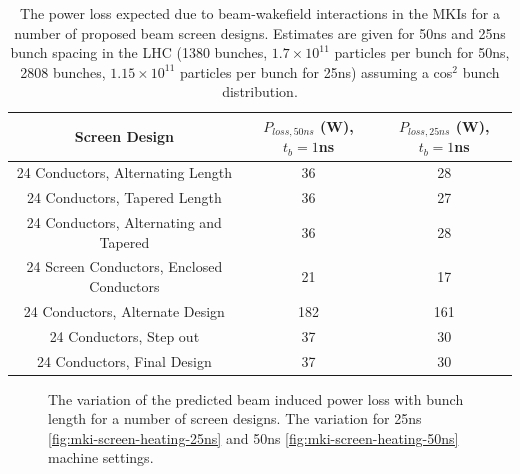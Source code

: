 \begin{table}
\caption{The power loss expected due to beam-wakefield interactions in the MKIs for a number of proposed beam screen designs. Estimates are given for 50ns and 25ns bunch spacing in the LHC (1380 bunches, $1.7 \times 10^{11}$ particles per bunch for 50ns, 2808 bunches, $1.15 \times 10^{11}$ particles per bunch for 25ns) assuming a cos$^{2}$ bunch distribution.}
\label{tab:heating-mki-screen-designs}
\begin{center}
\begin{tabular}{c | c | c}
Screen Design & $P_{loss,50ns}$ (W), $t_{b}=1$ns & $P_{loss,25ns}$ (W), $t_{b}=1$ns \\ \hline 
24 Conductors, Alternating Length & 36 & 28 \\ \hline %
24 Conductors, Tapered Length & 36 & 27 \\ \hline %
24 Conductors, Alternating and Tapered & 36 & 28 \\ \hline %
24 Screen Conductors, Enclosed Conductors & 21 & 17 \\ \hline %
24 Conductors, Alternate Design & 182 & 161 \\ \hline %
24 Conductors, Step out & 37 & 30 \\ \hline %
24 Conductors, Final Design & 37 & 30 \\ %
\end{tabular}
\end{center}
\end{table}

\begin{figure}
\caption{The variation of the predicted beam induced power loss with bunch length for a number of screen designs. The variation for 25ns \ref{fig:mki-screen-heating-25ns} and 50ns \ref{fig:mki-screen-heating-50ns} machine settings.}
\label{fig:mki-screens-heating-bunch-length}
\end{figure}
